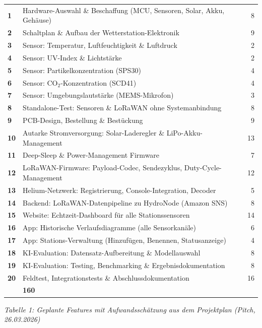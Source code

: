 \documentclass[11pt,a4paper]{scrartcl}
\begin{document}
\begin{longtable}{>{\bfseries}p{0.5cm} p{13.5cm} r}
  1  & Hardware-Auswahl \& Beschaffung (MCU, Sensoren, Solar, Akku, Gehäuse) & 8 \\
  \rowcolor{rowgray}
  2  & Schaltplan \& Aufbau der Wetterstation-Elektronik & 9 \\
  3  & Sensor: Temperatur, Luftfeuchtigkeit \& Luftdruck & 2 \\
  \rowcolor{rowgray}
  4  & Sensor: UV-Index \& Lichtstärke & 2 \\
  5  & Sensor: Partikelkonzentration (SPS30) & 4 \\
  \rowcolor{rowgray}
  6  & Sensor: CO${}_2$-Konzentration (SCD41) & 4 \\
  7  & Sensor: Umgebungslautstärke (MEMS-Mikrofon) & 3 \\
  \rowcolor{rowgray}
  8  & Standalone-Test: Sensoren \& LoRaWAN ohne Systemanbindung & 8 \\
  9  & PCB-Design, Bestellung \& Bestückung & 9 \\
  \rowcolor{rowgray}
  10 & Autarke Stromversorgung: Solar-Laderegler \& LiPo-Akku-Management & 13 \\
  11 & Deep-Sleep \& Power-Management Firmware & 7 \\
  \rowcolor{rowgray}
  12 & LoRaWAN-Firmware: Payload-Codec, Sendezyklus, Duty-Cycle-Management & 12 \\
  13 & Helium-Netzwerk: Registrierung, Console-Integration, Decoder & 5 \\
  \rowcolor{rowgray}
  14 & Backend: LoRaWAN-Datenpipeline zu HydroNode (Amazon SNS) & 8 \\
  15 & Website: Echtzeit-Dashboard für alle Stationssensoren & 14 \\
  \rowcolor{rowgray}
  16 & App: Historische Verlaufsdiagramme (alle Sensorkanäle) & 6 \\
  17 & App: Stations-Verwaltung (Hinzufügen, Benennen, Statusanzeige) & 4 \\
  \rowcolor{rowgray}
  18 & KI-Evaluation: Datensatz-Aufbereitung \& Modellauswahl & 8 \\
  19 & KI-Evaluation: Testing, Benchmarking \& Ergebnisdokumentation & 8 \\
  \rowcolor{rowgray}
  20 & Feldtest, Integrationstests \& Abschlussdokumentation & 16 \\
  \midrule
  \multicolumn{2}{r}{\textbf{Gesamt}} & \textbf{160} \\
\end{longtable}
\vspace{-1em}
\begin{center}
  \small\textit{Tabelle 1: Geplante Features mit Aufwandsschätzung aus dem Projektplan (Pitch, 26.03.2026)}
  \label{tab:features}
\end{center}
\end{document}
